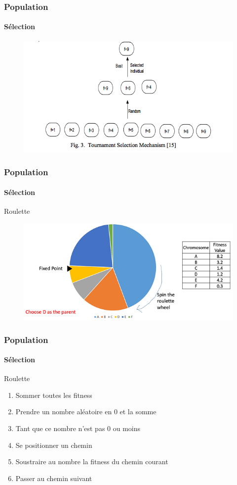 \documentclass{beamer}
\begin{document}
\begin{frame}
  \frametitle{Population}
  \framesubtitle{Sélection}
  \begin{figure}
    \includegraphics[scale=0.4]{tournament.png}
  \end{figure}
\end{frame}

\begin{frame}
  \frametitle{Population}
  \framesubtitle{Sélection}
  \centering
  Roulette \pause{}
  \begin{figure}
    \includegraphics[scale=0.6]{roulette.jpg}
  \end{figure}
\end{frame}

\begin{frame}
  \frametitle{Population}
  \framesubtitle{Sélection}
  \centering
  Roulette
  \begin{enumerate}
    \item Sommer toutes les fitness
    \item Prendre un nombre aléatoire en 0 et la somme
    \item Tant que ce nombre n'est pas 0 ou moins 
    \item Se positionner un chemin
    \item Soustraire au nombre la fitness du chemin courant
    \item Passer au chemin suivant
  \end{enumerate}
\end{frame}
\end{document}

